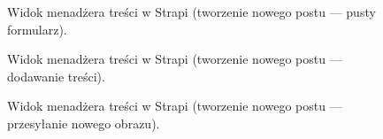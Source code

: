 \documentclass[a4paper, 12pt, twoside]{article}
\numberwithin{figure}{section}
\begin{document}
\begin{sloppypar}
\begin{figure}[H] 
    \centering
   \caption{Widok menadżera treści w Strapi (tworzenie nowego postu --- pusty formularz).}
   \label{fig:strapi-use-2.jpg}
\end{figure}

\begin{figure}[H] 
    \centering
   \caption{Widok menadżera treści w Strapi (tworzenie nowego postu --- dodawanie treści).}
   \label{fig:strapi-use-3.jpg}
\end{figure}

\begin{figure}[H] 
    \centering
   \caption{Widok menadżera treści w Strapi (tworzenie nowego postu --- przesyłanie nowego obrazu).}
   \label{fig:strapi-use-4.jpg}
\end{figure}


\end{sloppypar}
\end{document}
